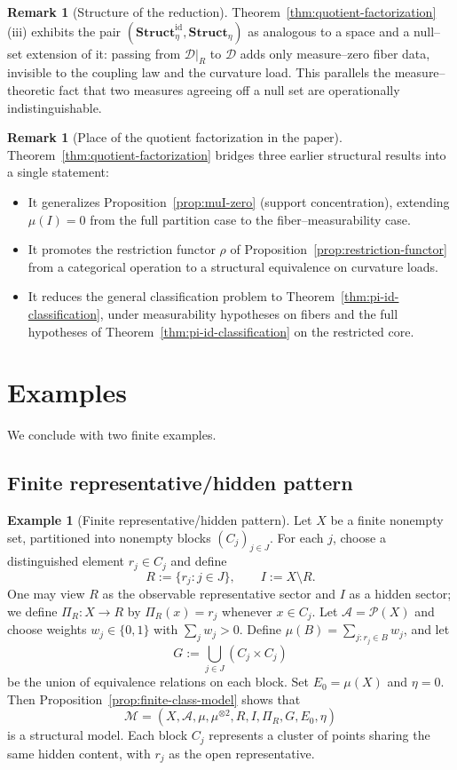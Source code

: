 \documentclass[11pt]{article}
\numberwithin{equation}{section}
\theoremstyle{definition}
\newtheorem{remark}[theorem]{Remark}
\newtheorem{example}[theorem]{Example}
\begin{document}
\begin{remark}[Structure of the reduction]\label{rem:reduction-structure}
\sloppy
Theorem~\ref{thm:quotient-factorization}(iii) exhibits the pair $(\mathbf{Struct}^{\mathrm{id}}_{\eta},\allowbreak\mathbf{Struct}_{\eta})$ as analogous to a space and a null--set extension of it: passing from $\mathcal D|_R$ to $\mathcal D$ adds only measure--zero fiber data, invisible to the coupling law and the curvature load. This parallels the measure--theoretic fact that two measures agreeing off a null set are operationally indistinguishable.
\end{remark}

\begin{remark}[Place of the quotient factorization in the paper]\label{rem:place-quotient}
\sloppy
Theorem~\ref{thm:quotient-factorization} bridges three earlier structural results into a single statement:
\begin{itemize}[nosep]
\item It generalizes Proposition~\ref{prop:muI-zero} (support concentration), extending $\mu(I)=0$ from the full partition case to the fiber--measurability case.
\item It promotes the restriction functor $\rho$ of Proposition~\ref{prop:restriction-functor} from a categorical operation to a structural equivalence on curvature loads.
\item It reduces the general classification problem to Theorem~\ref{thm:pi-id-classification}, under measurability hypotheses on fibers and the full hypotheses of Theorem~\ref{thm:pi-id-classification} on the restricted core.
\end{itemize}
\end{remark}


\section{Examples}
We conclude with two finite examples.
\subsection{Finite representative/hidden pattern}
\begin{example}[Finite representative/hidden pattern]
\sloppy
Let $X$ be a finite nonempty set, partitioned into nonempty blocks
$(C_j)_{j\in J}$.
For each $j$, choose a distinguished element $r_j\in C_j$ and define
\[
R := \{r_j : j\in J\},\qquad I := X\setminus R.
\]
One may view $R$ as the observable representative sector and $I$ as a hidden sector; we define $\Pi_R\colon X\to R$ by $\Pi_R(x)=r_j$ whenever $x\in C_j$.
Let $\mathcal A=\mathcal P(X)$ and choose weights $w_j\in\{0,1\}$ with $\sum_j w_j>0$.
Define $\mu(B)=\sum_{j : r_j\in B} w_j$, and let
\[
G := \bigcup_{j\in J} (C_j\times C_j)
\]
be the union of equivalence relations on each block.
Set $E_0=\mu(X)$ and $\eta=0$.
Then Proposition~\ref{prop:finite-class-model} shows that
\[
\mathcal M=(X,\mathcal A,\mu,\mu^{\otimes2},R,I,\Pi_R,G,E_0,\eta)
\]
is a structural model.
Each block $C_j$ represents a cluster of points sharing the same hidden content, with $r_j$ as the open representative.
\end{example}
\end{document}
